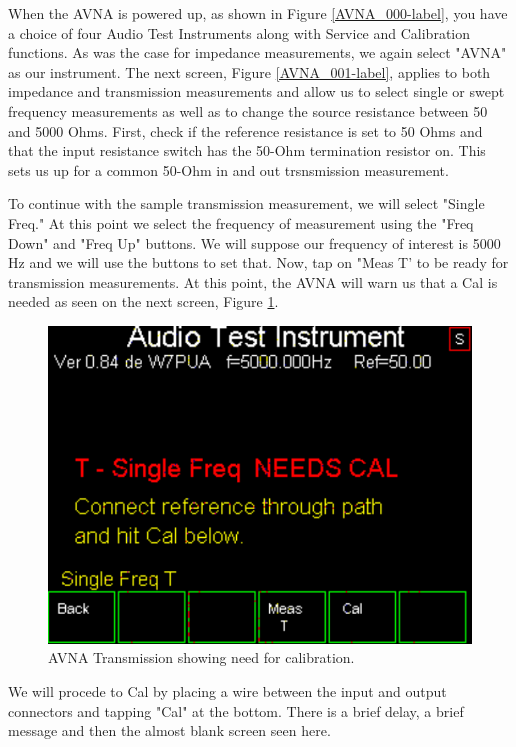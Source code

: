 When the AVNA is powered up, as shown in  Figure \ref{AVNA_000-label},  you have a choice of four Audio Test Instruments along with Service and Calibration functions.  As was the case for impedance measurements, we again select "AVNA" as our instrument.  The next screen, Figure  \ref{AVNA_001-label}, applies to both impedance and transmission measurements and allow us to select single or swept frequency measurements as well as to change the source resistance between 50 and 5000 Ohms.  First, check if the reference resistance is set to 50 Ohms and that the input resistance switch has the 50-Ohm termination resistor on.  This sets us up for a common 50-Ohm in and out trsnsmission measurement.

To continue with the sample transmission measurement, we will select "Single Freq."  At this point we select the frequency of measurement using the "Freq Down" and "Freq Up"  buttons.  We will suppose our frequency of interest is 5000 Hz and we will use the buttons to set that.  Now, tap on "Meas T' to be ready for transmission measurements.   At this point, the AVNA will warn us that a Cal is needed as seen on the next screen, Figure  \ref{AVNA_043-label}.
\begin{figure}[H]
\begin{center}
\includegraphics[scale=0.75]{./images/AVNA_043.pdf}
\caption{AVNA Transmission showing need for calibration.}
\label{AVNA_043-label}
\end{center}
\end{figure}
%
 We will procede to Cal by placing a wire between the input and output connectors and tapping "Cal" at the bottom.   There is a brief delay, a brief message and then the almost blank screen seen here.
